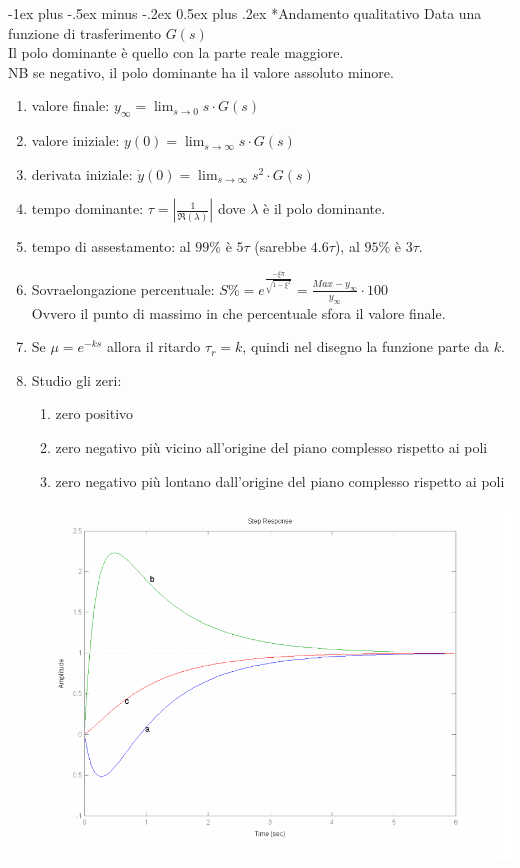 \documentclass[10pt,landscape, a4paper]{scrartcl} %
\makeatletter
\renewcommand{\section}{\@startsection{section}{1}{0mm}%
                                {-1ex plus -.5ex minus -.2ex}%
                                {0.5ex plus .2ex}%
                                {\normalfont\large\bfseries}}
\makeatother
\begin{document}
\begin{multicols*}{3}
\section*{Andamento qualitativo}
Data una funzione di trasferimento $G(s)$\\
Il polo dominante è quello con la parte reale maggiore.\\
NB se negativo, il polo dominante ha il valore assoluto minore.\\
\begin{enumerate}
	\item valore finale: $y_{\infty} = \lim_{s \to 0} s\cdot G(s)$
	\item valore iniziale: $y(0) = \lim_{s \to \infty} s\cdot G(s)$
	\item derivata iniziale: $\dot y(0) = \lim_{s \to \infty} s^2\cdot G(s)$
	\item tempo dominante: $\tau = \left| \frac{1}{\Re(\lambda)}\right|$ dove $\lambda$ è il polo dominante.
	\item tempo di assestamento: al $99\%$ è $5\tau$ (sarebbe $4.6\tau$), al $95\%$ è $3\tau$.
	\item Sovraelongazione percentuale: $S\% = e^{\frac{-\xi \pi}{\sqrt{1 - \xi^2}}} = \frac{Max - y_\infty}{y_\infty} \cdot 100$\\
			Ovvero il punto di massimo in che percentuale sfora il valore finale.
	\item Se $\mu = e^{-k s}$ allora il ritardo $\tau_r = k$, quindi nel disegno la funzione parte da $k$.
	\item Studio gli zeri:
	 \begin{multicols*}{2}
		\begin{enumerate}
			\item zero positivo
			\item zero negativo più vicino all'origine del piano complesso rispetto ai poli
			\item zero negativo più lontano dall'origine del piano complesso rispetto ai poli
		\end{enumerate} \includegraphics*[width=1\columnwidth]{zeri.png}
	 \end{multicols*}


\end{enumerate}
\end{multicols*}
\end{document}
